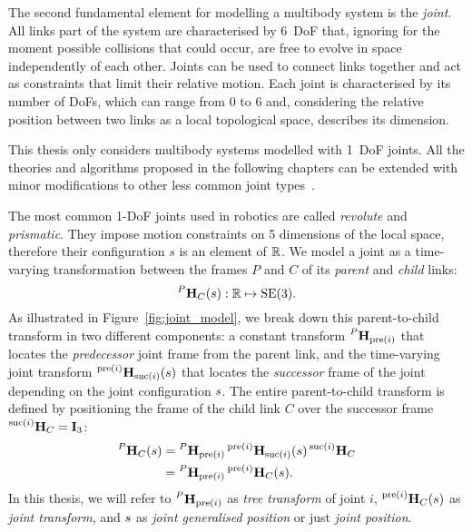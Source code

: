 The second fundamental element for modelling a multibody system is the \emph{joint}.
All links part of the system are characterised by 6~\ac{DoF} that, ignoring for the moment possible collisions that could occur, are free to evolve in space independently of each other.
Joints can be used to connect links together and act as constraints that limit their relative motion.
Each joint is characterised by its number of \aclp{DoF}, which can range from 0 to 6 and, considering the relative position between two links as a local topological space, describes its dimension.

\begin{assumption*}
%
This thesis only considers multibody systems modelled with 1~\ac{DoF} joints.
All the theories and algorithms proposed in the following chapters can be extended with minor modifications to other less common joint types~\parencite{featherstone_rigid_2008}.
%
\end{assumption*}

The most common 1-\ac{DoF} joints used in robotics are called \emph{revolute} and \emph{prismatic}.
They impose motion constraints on 5 dimensions of the local space, therefore their configuration $s$ is an element of $\realn$.
We model a joint as a time-varying transformation between the frames $P$ and $C$ of its \emph{parent} and \emph{child} links:
%
\begin{equation*}
    \homo[P]_C(\shape) : \realn \mapsto \SE(3)
    .
\end{equation*}
%
As illustrated in Figure~\ref{fig:joint_model}, we break down this parent-to-child transform in two different components: a constant transform $\homo[P]_{\operatorname{pre}(i)}$ that locates the \emph{predecessor} joint frame from the parent link, and the time-varying joint transform $\homo[\operatorname{pre}(i)]_{\operatorname{suc}(i)}(\shape)$ that locates the \emph{successor} frame of the joint depending on the joint configuration $\emph{s}$.
The entire parent-to-child transform is defined by positioning the frame of the child link $C$ over the successor frame $\homo[\operatorname{suc}(i)]_C = \eye_3$:
%
\begin{align}
    \label{equation:joint_model_parent_to_child_transform}
    \homo[P]_C(\shape) &= \homo[P]_{\operatorname{pre}(i)} \homo[\operatorname{pre}(i)]_{\operatorname{suc}(i)}(\shape) \homo[\operatorname{suc}(i)]_C \nonumber \\
    &= \homo[P]_{\operatorname{pre}(i)} \homo[\operatorname{pre}(i)]_C(\shape)
    .
\end{align}
%
In this thesis, we will refer to $\homo[P]_{\operatorname{pre}(i)}$ as \emph{tree transform} of joint $i$, $\homo[\operatorname{pre}(i)]_C(\shape)$ as \emph{joint transform}, and $\shape$ as \emph{joint generalised position} or just \emph{joint position}.


